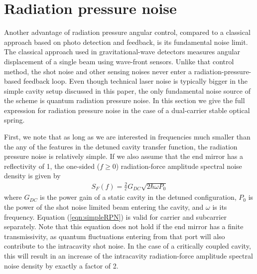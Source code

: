 \section{Radiation pressure noise}
\label{sec:V}

Another advantage of radiation pressure angular control, compared to a classical approach based on photo detection and feedback, is its fundamental noise limit. 
The classical approach used in gravitational-wave detectors measures angular displacement of a single beam using wave-front sensors.
Unlike that control method, the shot noise and other sensing noises %
never enter a radiation-pressure-based feedback loop. Even though technical laser noise is typically bigger in the simple cavity setup discussed in this paper, the only fundamental noise source of the scheme is quantum radiation pressure noise. In this section we give the full expression for radiation pressure noise in the case of a dual-carrier stable optical spring.

First, we note that as long as we are interested in frequencies much smaller than the any of the features in the detuned cavity transfer function, the radiation pressure noise is relatively simple. If we also assume that the end mirror has a reflectivity of 1, the one-sided ($f\ge0$) radiation-force amplitude spectral noise density is given by
\begin{align}
\label{eqn:simpleRPN}
S_F(f) = \frac{2}{c} G_{DC} \sqrt{2 \hbar \omega P_0}
\end{align}
where $G_{DC}$ is the power gain of a static cavity in the detuned configuration, $P_0$ is the power of the shot noise limited beam entering the cavity, and $\omega$ is its frequency.
Equation (\ref{eqn:simpleRPN}) is valid for carrier and subcarrier separately.
Note that this equation does not hold if the end mirror has a finite transmissivity, as quantum fluctuations entering from that port will also contribute to the intracavity shot noise. In the case of a critically coupled cavity, this will result in an increase of the intracavity radiation-force amplitude spectral noise density by exactly a factor of 2.

